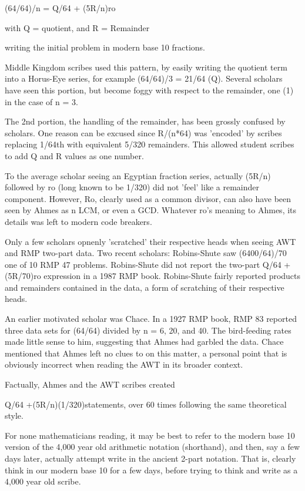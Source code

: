 \documentclass[12pt]{article}
\begin{document}
(64/64)/n = Q/64 + (5R/n)ro

with Q = quotient, and R = Remainder

writing the initial problem in modern base 10 fractions.

Middle Kingdom scribes used this pattern, by easily writing the quotient term into a Horus-Eye series, for example (64/64)/3 = 21/64 (Q). Several scholars have seen this portion, but become foggy with respect to the remainder, one (1) in the case of n = 3.

The 2nd portion, the handling of the remainder, has been grossly confused by scholars. One reason can be excused since R/(n*64) was 'encoded' by scribes replacing 1/64th with equivalent 5/320 remainders. This allowed student scribes to add Q and R values as one number.

To the average scholar seeing an Egyptian fraction series, actually (5R/n) followed by ro (long known to be 1/320) did not 'feel' like a remainder component. However, Ro, clearly used as a common divisor, can also have been seen by Ahmes as n LCM, or even a GCD. Whatever ro's meaning to Ahmes, its details was left to modern code breakers.

Only a few scholars opnenly 'scratched' their respective heads when seeing AWT and RMP two-part data. Two recent scholars: Robins-Shute saw (6400/64)/70 one of 10 RMP 47 problems. Robins-Shute did not report the two-part Q/64 + (5R/70)ro expression in a 1987 RMP book. Robins-Shute fairly reported products and remainders contained in the data, a form of scratching of their respective heads.

An earlier motivated scholar was Chace. In a 1927 RMP book, RMP 83 reported three data sets for (64/64) divided by n = 6, 20, and 40. The bird-feeding rates made little sense to him, suggesting that Ahmes had garbled the data. Chace mentioned that Ahmes left no clues to on this matter, a personal point that is obviously incorrect when reading the AWT in its broader context.

Factually, Ahmes and the AWT scribes created

Q/64 +(5R/n)(1/320)statements, over 60 times following the same theoretical style.

For none mathematicians reading, it may be best to refer to the modern base 10 version of the 4,000 year old arithmetic notation (shorthand), and then, say a few days later, actually attempt write in the ancient 2-part notation. That is, clearly think in our modern base 10 for a few days, before trying to think and write as a 4,000 year old scribe.
\end{document}
